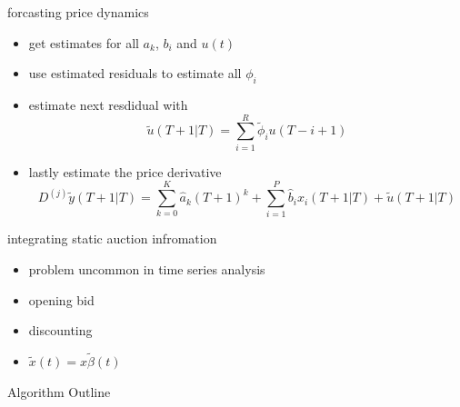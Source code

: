 \documentclass[hyperref={pdfpagelabels=false}]{beamer}
\begin{document}
\begin{frame}{forcasting price dynamics}
\begin{itemize}
	\item get estimates for all $a_k$, $b_i$ and $u(t)$
	\item use estimated residuals to estimate all $\phi_i$
	\item estimate next resdidual with \begin{equation}  \tilde{u}(T+1|T)=\sum_{i=1}^R\tilde{\phi}_iu(T-i+1) \nonumber \end{equation}
	\item lastly estimate the price derivative \begin{equation} D^{(j)}\tilde{y}(T+1|T) =\sum_{k=0}^K\hat{a}_k(T+1)^k+\sum_{i=1}^P\hat{b}_ix_i(T+1|T)+\tilde{u}(T+1|T) \nonumber \end{equation}
\end{itemize}	
\end{frame}

\begin{frame}{integrating static auction infromation}%
\begin{itemize}
	\item problem uncommon in time series analysis
	\item opening bid
	\item discounting
	\item $\tilde{x}(t)=x\tilde{\beta}(t)$
\end{itemize}
\end{frame}

\begin{frame}{Algorithm Outline}

\end{frame}
\end{document}
